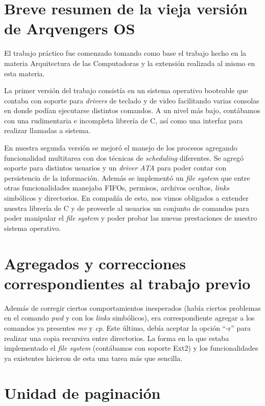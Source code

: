 \documentclass[a4paper,10pt]{article}
\begin{document}
\newpage
\section{Breve resumen de la vieja versión de Arqvengers OS}
El trabajo práctico fue comenzado tomando como base el trabajo hecho en la materia Arquitectura de las Computadoras y la extensión 
realizada al mismo en esta materia.

La primer versión del trabajo consistía en un sistema operativo booteable que contaba con soporte para \textit{drivers} de
 teclado y de video facilitando varias consolas en donde podían ejecutarse distintos comandos. 
A un nivel más bajo, contábamos con una rudimentaria e incompleta librería de C, así como una interfaz para realizar 
llamadas a sistema.

En nuestra segunda versión se mejoró el manejo de los procesos agregando funcionalidad multitarea con dos técnicas de 
\textit{scheduling} diferentes. Se agregó soporte para distintos usuarios y un \textit{driver ATA} para poder contar con persistencia 
de la información. Además se implementó un \textit{file system} que entre otras funcionalidades manejaba FIFOs, permisos, 
archivos ocultos, \textit{links} simbólicos y directorios. En compañía de esto, nos vimos obligados a extender nuestra librería de 
C y de proveerle al usuarios un conjunto de comandos para poder manipular el \textit{file system} y poder probar las nuevas 
prestaciones de nuestro sistema operativo.

\newpage

\section{Agregados y correcciones correspondientes al trabajo previo}

Además de corregir ciertos comportamientos inesperados (había ciertos problemas en el comando \textit{pwd} y con los
\textit{links} simbólicos), era correspondiente agregar a los comandos ya presentes \textit{mv} y \textit{cp}. Este último, 
debía aceptar la opción ``-r'' para realizar una copia recursiva entre directorios. La forma en la que estaba implementado 
el \textit{file system} (contábamos con soporte Ext2) y los funcionalidades ya existentes hicieron de esta una tarea más que sencilla.

\newpage

\section{Unidad de paginación}
\end{document}
